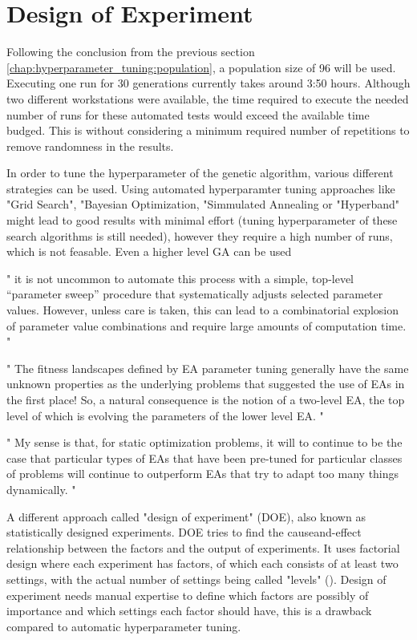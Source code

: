 \section{Design of Experiment}
\label{chap:hyperparameter_tuning:other_parameter}

Following the conclusion from the previous section \ref{chap:hyperparameter_tuning:population}, a population size of 96 will be used. Executing one run for 30 generations currently takes around 3:50 hours. Although two different workstations were available, the time required to execute the needed number of runs for these automated tests would exceed the available time budged. This is without considering a minimum required number of repetitions to remove randomness in the results.

In order to tune the hyperparameter of the genetic algorithm, various different strategies can be used. Using automated hyperparamter tuning approaches like "Grid Search", "Bayesian Optimization, "Simmulated Annealing or "Hyperband" might lead to good results with minimal effort (tuning hyperparameter of these search algorithms is still needed), however they require a high number of runs, which is not feasable. Even a higher level GA can be used 


"
it is not uncommon to automate this process with a simple, top-level “parameter sweep” procedure that systematically adjusts selected parameter values. However, unless care is taken, this can lead to a combinatorial explosion of parameter value combinations and require large amounts of computation time.
"\cite{kacprzyk_parameter_2007}

"
The fitness landscapes defined by EA parameter tuning generally have the same unknown properties as the underlying problems that suggested the use of EAs in the first place! So, a natural consequence is the notion of a two-level EA, the top level of which is evolving the parameters of the lower level EA.
"\cite{kacprzyk_parameter_2007}

"
My sense is that, for static optimization problems, it will to continue to be the case that particular types of EAs that have been pre-tuned for particular classes of problems will continue to outperform EAs that try to adapt too many things dynamically.
"\cite{kacprzyk_parameter_2007}


A different approach called "design of experiment" (DOE), also known as statistically designed experiments. DOE tries to find the causeand-effect relationship between the factors and the output of experiments.
It uses factorial design where each experiment has factors, of which each consists of at least two settings, with the actual number of settings being called "levels" (\cite{yang_design_2009}). Design of experiment needs manual expertise to define which factors are possibly of importance and which settings each factor should have, this is a drawback compared to automatic hyperparameter tuning.

